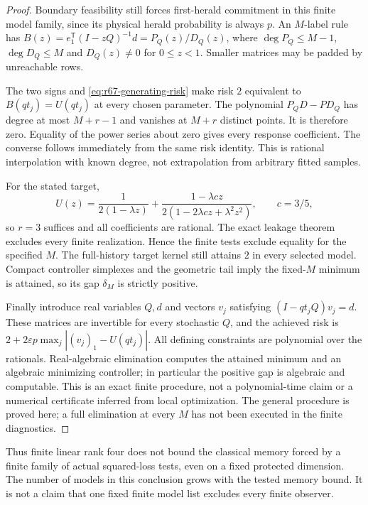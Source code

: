 \begin{proof}
Boundary feasibility still forces first-herald commitment in this finite model family, since its physical herald probability is always $p$. An $M$-label rule has
$B(z)=e_1^{\mathsf T}(I-zQ)^{-1}d=P_Q(z)/D_Q(z)$,
where $\deg P_Q\le M-1$, $\deg D_Q\le M$ and $D_Q(z)\ne0$ for $0\le z<1$. Smaller matrices may be padded by unreachable rows.

The two signs and \eqref{eq:r67-generating-risk} make risk $2$ equivalent to $B(qt_j)=U(qt_j)$ at every chosen parameter. The polynomial
$P_QD-PD_Q$ has degree at most $M+r-1$ and vanishes at $M+r$ distinct points. It is therefore zero. Equality of the power series about zero gives every response coefficient. The converse follows immediately from the same risk identity. This is rational interpolation with known degree, not extrapolation from arbitrary fitted samples.

For the stated target,
\[
 U(z)=\frac1{2(1-\lambda z)}+
       \frac{1-\lambda cz}{2(1-2\lambda cz+\lambda^2z^2)},
 \qquad c=3/5,
\]
so $r=3$ suffices and all coefficients are rational. The exact leakage theorem excludes every finite realization. Hence the finite tests exclude equality for the specified $M$. The full-history target kernel still attains $2$ in every selected model. Compact controller simplexes and the geometric tail imply the fixed-$M$ minimum is attained, so its gap $\delta_M$ is strictly positive.

Finally introduce real variables $Q,d$ and vectors $v_j$ satisfying
$(I-qt_jQ)v_j=d$. These matrices are invertible for every stochastic $Q$, and the achieved risk is
$2+2\varepsilon p\max_j|(v_j)_1-U(qt_j)|$.
All defining constraints are polynomial over the rationals. Real-algebraic elimination computes the attained minimum and an algebraic minimizing controller; in particular the positive gap is algebraic and computable. This is an exact finite procedure, not a polynomial-time claim or a numerical certificate inferred from local optimization. The general procedure is proved here; a full elimination at every $M$ has not been executed in the finite diagnostics.
\end{proof}

Thus finite linear rank four does not bound the classical memory forced by a finite family of actual squared-loss tests, even on a fixed protected dimension. The number of models in this conclusion grows with the tested memory bound. It is not a claim that one fixed finite model list excludes every finite observer.

